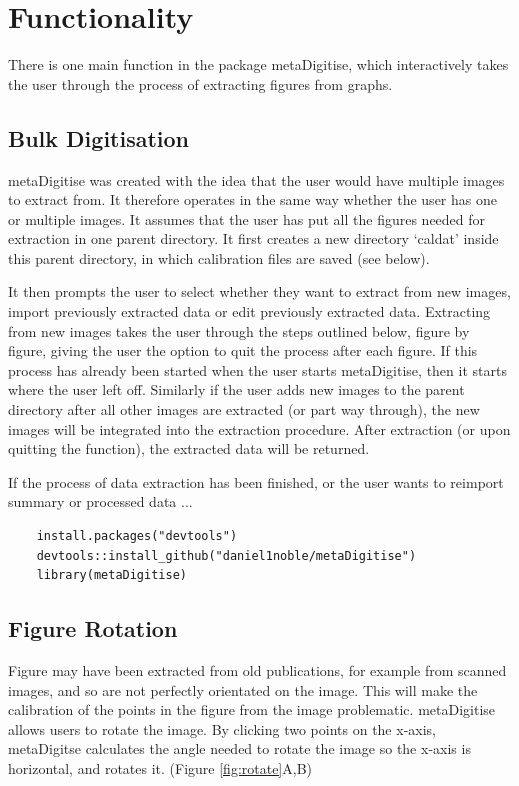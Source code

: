 \documentclass{article}
\begin{document}
\section{Functionality}
There is one main function in the package metaDigitise, which interactively takes the user through the process of extracting figures from graphs.

\subsection{Bulk Digitisation}
metaDigitise was created with the idea that the user would have multiple images to extract from. It therefore operates in the same way whether the user has one or multiple images. It assumes that the user has put all the figures needed for extraction in one parent directory. It first creates a new directory `caldat' inside this parent directory, in which calibration files are saved (see below). 

It then prompts the user to select whether they want to extract from new images, import previously extracted data or edit previously extracted data. Extracting from new images takes the user through the steps outlined below, figure by figure, giving the user the option to quit the process after each figure. If this process has already been started when the user starts metaDigitise, then it starts where the user left off. Similarly if the user adds new images to the parent directory after all other images are extracted (or part way through), the new images will be integrated into the extraction procedure. After extraction (or upon quitting the function), the extracted data will be returned. %


If the process of data extraction has been finished, or the user wants to reimport summary or processed data ...

\begin{verbatim}
	install.packages("devtools")
	devtools::install_github("daniel1noble/metaDigitise")
	library(metaDigitise)
\end{verbatim}


\subsection{Figure Rotation}
Figure may have been extracted from old publications, for example from scanned images, and so are not perfectly orientated on the image. This will make the calibration of the points in the figure from the image problematic. metaDigitise allows users to rotate the image. By clicking two points on the x-axis, metaDigitse calculates the angle needed to rotate the image so the x-axis is horizontal, and rotates it. (Figure \ref{fig:rotate}A,B)
\end{document}
